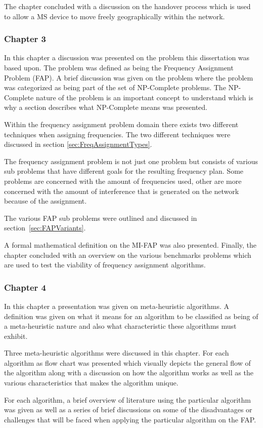 The chapter concluded with a discussion on the handover process which is used to allow a MS device to move freely geographically within the network. 
\subsubsection{Chapter 3}
In this chapter a discussion was presented on the problem this dissertation was based upon. The problem was defined as being the Frequency Assignment Problem (FAP). A brief discussion was given on the problem where the problem was categorized as being part of the set of NP-Complete problems. The NP-Complete nature of the problem is an important concept to understand which is why a section describes what NP-Complete means was presented.

Within the frequency assignment problem domain there exists two different techniques when assigning frequencies. The two different techniques were discussed in section \ref{sec:FreqAssignmentTypes}. 

The frequency assignment problem is not just one problem but consists of various sub problems that have different goals for the resulting frequency plan. Some problems are concerned with the amount of frequencies used, other are more concerned with the amount of interference that is generated on the network because of the assignment.

The various FAP sub problems were outlined and discussed in section~\ref{sec:FAPVariants}.

A formal mathematical definition on the MI-FAP was also presented. Finally, the chapter concluded with an overview on the various benchmarks problems which are used to test the viability of frequency assignment algorithms.
\subsubsection{Chapter 4}
In this chapter a presentation was given on meta-heuristic algorithms. A definition was given on what it means for an algorithm to be classified as being of a meta-heuristic nature and also what characteristic these algorithms must exhibit.

Three meta-heuristic algorithms were discussed in this chapter. For each algorithm as flow chart was presented which visually depicts the general flow of the algorithm along with a discussion on how the algorithm works as well as the various characteristics that makes the algorithm unique.

For each algorithm, a brief overview of literature using the particular algorithm was given as well as a series of brief discussions on some of the disadvantages or challenges that will be faced when applying the particular algorithm on the FAP.

